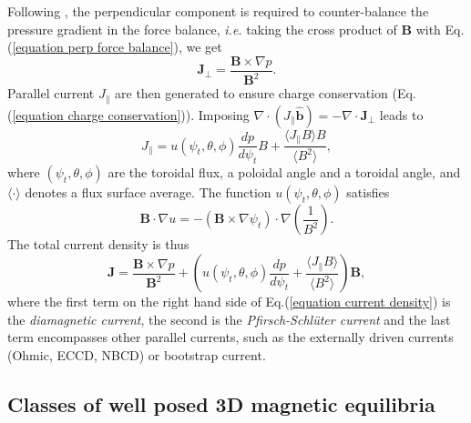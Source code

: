 \documentclass[my_thesis.tex]{subfiles}
\begin{document}
Following \citet{Helander2014}, the perpendicular component is required to counter-balance the pressure gradient in the force balance, \textit{i.e.} taking the cross product of $\mathbf{B}$ with Eq.(\ref{equation perp force balance}), we get
\begin{equation}
	\mathbf{J}_\perp = \frac{\mathbf{B}\times\nabla p}{\mathbf{B}^2}.
\end{equation}
Parallel current $J_\parallel$ are then generated to ensure charge conservation (Eq.(\ref{equation charge conservation})). Imposing $\nabla \cdot (J_\parallel\mathbf{\hat{b}}) = - \nabla\cdot\mathbf{J}_\perp$ leads to 
\begin{equation}
	J_\parallel = u(\psi_t,\theta,\phi)\frac{dp}{d\psi_t}B + \frac{\langle J_\parallel B\rangle B}{\langle B^2\rangle},
\end{equation}
where $(\psi_t,\theta,\phi)$ are the toroidal flux, a poloidal angle and a toroidal angle, and $\langle\cdot\rangle$ denotes a flux surface average. The function $u(\psi_t,\theta,\phi)$ satisfies
\begin{equation}
	\mathbf{B}\cdot\nabla u = -(\mathbf{B}\times\nabla\psi_t)\cdot\nabla\left(\frac{1}{B^2}\right). \label{eq.diff_u}
\end{equation}
The total current density is thus
\begin{equation}
	\mathbf{J} = \frac{\mathbf{B}\times\nabla p}{\mathbf{B}^2} + \left(u(\psi_t,\theta,\phi)\frac{dp}{d\psi_t} + \frac{\langle J_\parallel B\rangle}{\langle B^2\rangle}\right)\mathbf{B}, \label{equation current density}
\end{equation}
where the first term on the right hand side of Eq.(\ref{equation current density}) is the \emph{diamagnetic current}, the second is the \emph{Pfirsch-Schl\"uter current} and the last term encompasses other parallel currents, such as the externally driven currents (Ohmic, \ac{ECCD}, \ac{NBCD}) or bootstrap current.




\subsection{Classes of well posed 3D magnetic equilibria}
\end{document}
